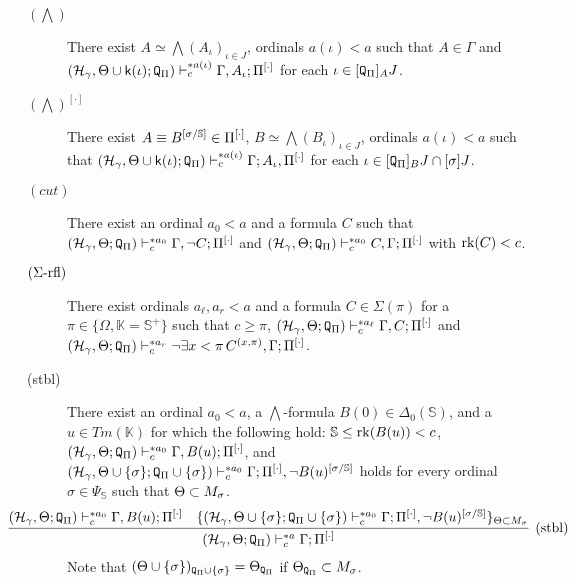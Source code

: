 \documentclass{article}
\newcommand{\mS}{\mathbb{S}}
\newcommand{\mK}{\mathbb{K}}
\begin{document}
{\begin{description}
\item[$(\bigwedge)$]
There exist 
$A\simeq\bigwedge(A_{\iota})_{ \iota\in J}$,  ordinals $a(\iota)<a$ such that
$A\in\Gamma$ and
$(\mathcal{H}_{\gamma},\Theta\cup{\sf k}(\iota);{\tt Q}_{\Pi}
)
\vdash^{*a(\iota)}_{c}\Gamma,
A_{\iota};\Pi^{[\cdot]}$
for each $\iota\in[{\tt Q}_{\Pi}]_{A} J$.



\item[$(\bigwedge)^{[\cdot]}$]
There exist 
$A\equiv B^{[\sig/\mS]}\in\Pi^{[\cdot]}$,
$B\simeq\bigwedge(B_{\iota})_{\iota\in J}$, ordinals
$a(\iota)<a$ such that 
$(\mathcal{H}_{\gamma},\Theta\cup{\sf k}(\iota);{\tt Q}_{\Pi})\vdash^{*a(\iota)}_{c}\Gamma;
A_{\iota},\Pi^{[\cdot]}$
for each $\iota\in [{\tt Q}_{\Pi}]_{B}J\cap[\sigma]J$.



\item[$(cut)$]
There exist an ordinal $a_{0}<a$ and a formula $C$
such that 
$(\mathcal{H}_{\gamma},\Theta;{\tt Q}_{\Pi})\vdash^{*a_{0}}_{c}\Gamma,\lnot C;\Pi^{[\cdot]}$
and
$(\mathcal{H}_{\gamma},\Theta;{\tt Q}_{\Pi})\vdash^{*a_{0}}_{c}C,\Gamma;\Pi^{[\cdot]}$
with $\mbox{{\rm rk}}(C)<c$.


\item[$(\Sigma\mbox{{\rm -rfl}})$]

There exist ordinals
$a_{\ell}, a_{r}<a$ and a formula $C\in\Sigma(\pi)$ for a 
$\pi\in\{\Omega,\mK=\mS^{+}\}$
such that $c\geq \pi$, 
$(\mathcal{H}_{\gamma},\Theta;{\tt Q}_{\Pi}
)\vdash^{* a_{\ell}}_{c}\Gamma,C;\Pi^{[\cdot]}$
and
$(\mathcal{H}_{\gamma},\Theta;{\tt Q}_{\Pi}
)\vdash^{* a_{r}}_{c}
\lnot \exists x<\pi\,C^{(x,\pi)}, \Gamma;\Pi^{[\cdot]}$.




\item[({\rm stbl})]
There exist an ordinal $a_{0}<a$,
a $\bigwedge$-formula 
$B(0)\in\Delta_{0}(\mathbb{S})$,
and a $u\in Tm(\mathbb{K})$ 
for which the following hold:
$\mathbb{S}\leq {\rm rk}(B(u))<c$,
$(\mathcal{H}_{\gamma},\Theta;{\tt Q}_{\Pi}
)\vdash^{* a_{0}}_{c}
\Gamma, B(u);\Pi^{[\cdot]}$, 
and 
$(\mathcal{H}_{\gamma},\Theta\cup\{\sigma\};{\tt Q}_{\Pi}\cup\{\sigma\}
)
\vdash^{* a_{0}}_{c}
\Gamma;\Pi^{[\cdot]}, \lnot B(u)^{[\sigma/\mathbb{S}]}$
holds for every ordinal $\sigma\in\Psi_{\mS}$ such that
$\Theta\subset M_{\sigma}$.
{\small
\[
\hspace{-15mm}
\infer[({\rm stbl})]{(\mathcal{H}_{\gamma},\Theta;{\tt Q}_{\Pi}
)
\vdash^{* a}_{c}
\Gamma;\Pi^{[\cdot]}}
{
(\mathcal{H}_{\gamma},\Theta;{\tt Q}_{\Pi}
)\vdash^{* a_{0}}_{c}
\Gamma, B(u);\Pi^{[\cdot]}
&
\{
(\mathcal{H}_{\gamma},\Theta\cup\{\sig\};{\tt Q}_{\Pi}\cup\{\sig\}
)
\vdash^{* a_{0}}_{c}
\Gamma;\Pi^{[\cdot]}, \lnot B(u)^{[\sigma/\mathbb{S}]}
\}_{\Tht\subset M_{\sigma}}
}
\]
}
Note that $(\Theta\cup\{\sigma\})_{{\tt Q}_{\Pi}\cup\{\sigma\}}=\Theta_{{\tt Q}_{\Pi}}$ if $\Theta_{{\tt Q}_{\Pi}}\subset M_{\sigma}$.

\end{description}
}
\edf
\end{document}
